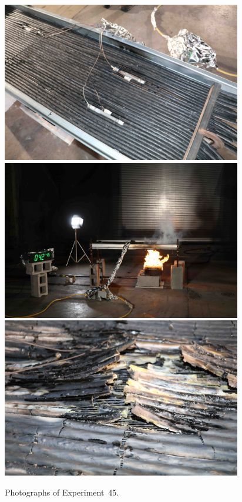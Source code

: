 \begin{figure}[p]
\centering
\includegraphics[height=2.75in]{../FIGURES/Test_45_setup} \\
\includegraphics[height=2.75in]{../FIGURES/Test_45_42_min_46_s} \\
\includegraphics[height=2.75in]{../FIGURES/Test_45_damage}
\caption[Photographs of Experiment~45]{Photographs of Experiment~45.}
\label{fig:Test_45_photos}
\end{figure}


\clearpage

